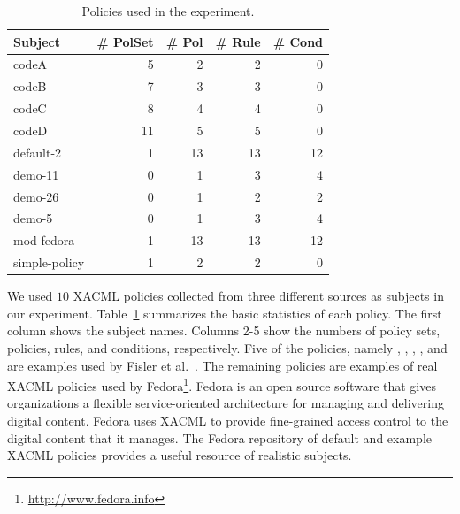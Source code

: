 \begin{table}[t]%
\centering \caption{\label{table:subjects} Policies used in the
experiment.}
\begin{small}
\begin{tabular}{|l|r|r|r|r|} \hline

   Subject &  \# PolSet &     \# Pol &    \# Rule &    \# Cond \\ \hline \hline

     codeA &          5 &          2 &          2 &          0 \\ \hline

     codeB &          7 &          3 &          3 &          0 \\ \hline

     codeC &          8 &          4 &          4 &          0 \\ \hline

     codeD &         11 &          5 &          5 &          0 \\ \hline

 default-2 &          1 &         13 &         13 &         12 \\ \hline

   demo-11 &          0 &          1 &          3 &          4 \\ \hline

   demo-26 &          0 &          1 &          2 &          2 \\ \hline

    demo-5 &          0 &          1 &          3 &          4 \\ \hline

mod-fedora &          1 &         13 &         13 &         12 \\
\hline

simple-policy &       1 &          2 &          2 &          0 \\
\hline

\end{tabular}
\end{small}
\end{table}

We used $10$ XACML policies collected from three different sources
as subjects in our experiment. Table~\ref{table:subjects} summarizes
the basic statistics of each policy. The first column shows the
subject names. Columns 2-5 show the numbers of policy sets,
policies, rules, and conditions, respectively. Five of the policies,
namely , , ,
, and  are examples used by Fisler et
al.~\cite{fisler05:verification,greenberg05:soundness}. The
remaining policies are examples of real XACML policies used by
Fedora\footnote{\url{http://www.fedora.info}}. Fedora is an open
source software that gives organizations a flexible service-oriented
architecture for managing and delivering digital content. Fedora
uses XACML to provide fine-grained access control to the digital
content that it manages. The Fedora repository of default and
example XACML policies provides a useful resource of realistic
subjects.

